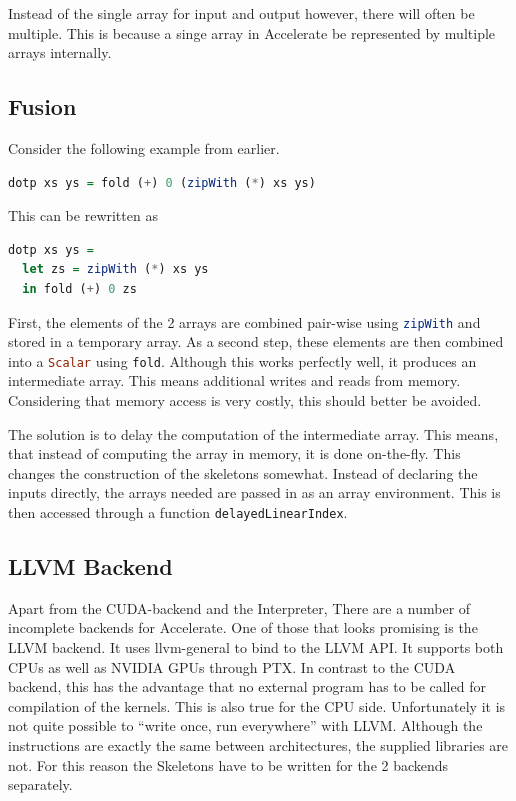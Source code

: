 \documentclass[a4paper,bibliography=totocnumbered,parskip,headsepline]{scrbook}
\begin{document}
Instead of the single array for input and output however, there will often be multiple.
This is because a singe array in Accelerate be represented by multiple arrays internally.
\newpage
\subsection{Fusion}
Consider the following example from earlier.
\begin{lstlisting}[language=haskell]
dotp xs ys = fold (+) 0 (zipWith (*) xs ys)
\end{lstlisting}

This can be rewritten as

\begin{lstlisting}[language=haskell]
dotp xs ys =
  let zs = zipWith (*) xs ys
  in fold (+) 0 zs
\end{lstlisting}

First, the elements of the 2 arrays are combined pair-wise using \lstinline[language=haskell]!zipWith! and stored in a temporary array.
As a second step, these elements are then combined into a \lstinline[language=haskell]!Scalar! using \lstinline[language=haskell]!fold!.
Although this works perfectly well, it produces an intermediate array.
This means additional writes and reads from memory.
Considering that memory access is very costly, this should better be avoided.

The solution is to delay the computation of the intermediate array.
This means, that instead of computing the array in memory, it is done on-the-fly.
This changes the construction of the skeletons somewhat.
Instead of declaring the inputs directly, the arrays needed are passed in as an array environment.
This is then accessed through a function \lstinline[language=haskell]!delayedLinearIndex!.

\subsection{LLVM Backend}
Apart from the CUDA-backend and the Interpreter, There are a number of incomplete backends for Accelerate.
One of those that looks promising is the LLVM backend.\cite{trevor2014llvm}
It uses llvm-general to bind to the LLVM API.
It supports both CPUs as well as NVIDIA GPUs through PTX.
In contrast to the CUDA backend, this has the advantage that no external program has to be called for compilation of the kernels.
This is also true for the CPU side.
Unfortunately it is not quite possible to ``write once, run everywhere'' with LLVM.
Although the instructions are exactly the same between architectures, the supplied libraries are not.
For this reason the Skeletons have to be written for the 2 backends separately.
\end{document}

